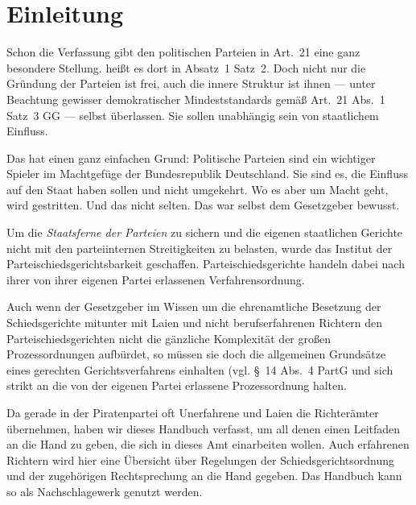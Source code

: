 
\chapter{Einleitung}
Schon die Verfassung gibt den politischen Parteien in Art.~21 eine ganz besondere Stellung.
 heißt es dort in Absatz~1 Satz~2.
Doch nicht nur die Gründung der Parteien ist frei, auch die innere Struktur ist ihnen --- unter Beachtung gewisser demokratischer Mindeststandards gemäß Art.~21 Abs.~1 Satz~3 GG --- selbst überlassen.
Sie sollen unabhängig sein von staatlichem Einfluss.

Das hat einen ganz einfachen Grund: Politische Parteien sind ein wichtiger Spieler im Machtgefüge der Bundesrepublik Deutschland.
Sie sind es, die Einfluss auf den Staat haben sollen und nicht umgekehrt.
Wo es aber um Macht geht, wird gestritten.
Und das nicht selten.
Das war selbst dem Gesetzgeber bewusst.

Um die \emph{Staatsferne der Parteien} zu sichern und die eigenen staatlichen Gerichte nicht mit den parteiinternen Streitigkeiten zu belasten, wurde das Institut der Parteischiedsgerichtsbarkeit geschaffen.
Parteischiedsgerichte handeln dabei nach ihrer von ihrer eigenen Partei erlassenen Verfahrensordnung.

Auch wenn der Gesetzgeber im Wissen um die ehrenamtliche Besetzung der Schiedsgerichte mitunter mit Laien und nicht berufserfahrenen Richtern den Parteischiedsgerichten nicht die gänzliche Komplexität der großen Prozessordnungen aufbürdet, so müssen sie doch die allgemeinen Grundsätze eines gerechten Gerichtsverfahrens einhalten (vgl. \S~14 Abs.~4 PartG und sich strikt an die von der eigenen Partei erlassene Prozessordnung halten.

Da gerade in der Piratenpartei oft Unerfahrene und Laien die Richterämter übernehmen, haben wir dieses Handbuch verfasst, um all denen einen Leitfaden an die Hand zu geben, die sich in dieses Amt einarbeiten wollen.
Auch erfahrenen Richtern wird hier eine Übersicht über Regelungen der Schiedsgerichtsordnung und der zugehörigen Rechtsprechung an die Hand gegeben.
Das Handbuch kann so als Nachschlagewerk genutzt werden.

